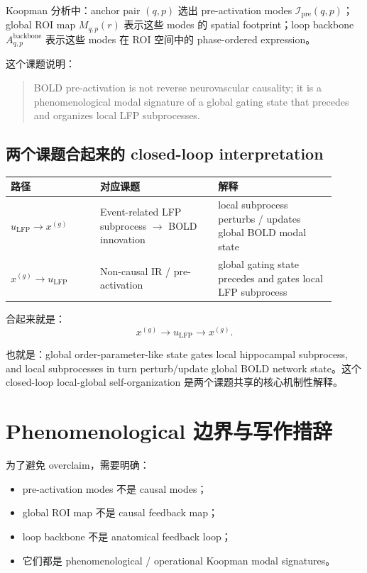 \documentclass[11pt,a4paper]{ctexart}
\begin{document}
Koopman 分析中：anchor pair $(q,p)$ 选出 pre-activation modes $\mathcal I_{\mathrm{pre}}(q,p)$；global ROI map $M_{q,p}(r)$ 表示这些 modes 的 spatial footprint；loop backbone $A_{q,p}^{\mathrm{backbone}}$ 表示这些 modes 在 ROI 空间中的 phase-ordered expression。

这个课题说明：
\begin{quote}
    BOLD pre-activation is not reverse neurovascular causality; it is a phenomenological modal signature of a global gating state that precedes and organizes local LFP subprocesses.
\end{quote}

\subsection{两个课题合起来的 closed-loop interpretation}

\begin{center}
\begin{tabular}{p{0.25\linewidth}p{0.33\linewidth}p{0.33\linewidth}}
\toprule
路径 & 对应课题 & 解释 \\
\midrule
$u_{\mathrm{LFP}} \rightarrow x^{(g)}$ & Event-related LFP subprocess $\rightarrow$ BOLD innovation & local subprocess perturbs / updates global BOLD modal state \\
$x^{(g)} \rightarrow u_{\mathrm{LFP}}$ & Non-causal IR / pre-activation & global gating state precedes and gates local LFP subprocess \\
\bottomrule
\end{tabular}
\end{center}

合起来就是：
\begin{equation}
    x^{(g)} \rightarrow u_{\mathrm{LFP}} \rightarrow x^{(g)}.
\end{equation}

也就是：global order-parameter-like state gates local hippocampal subprocess, and local subprocesses in turn perturb/update global BOLD network state。这个 closed-loop local-global self-organization 是两个课题共享的核心机制性解释。

\section{Phenomenological 边界与写作措辞}

为了避免 overclaim，需要明确：
\begin{itemize}
    \item pre-activation modes 不是 causal modes；
    \item global ROI map 不是 causal feedback map；
    \item loop backbone 不是 anatomical feedback loop；
    \item 它们都是 phenomenological / operational Koopman modal signatures。
\end{itemize}
\end{document}
